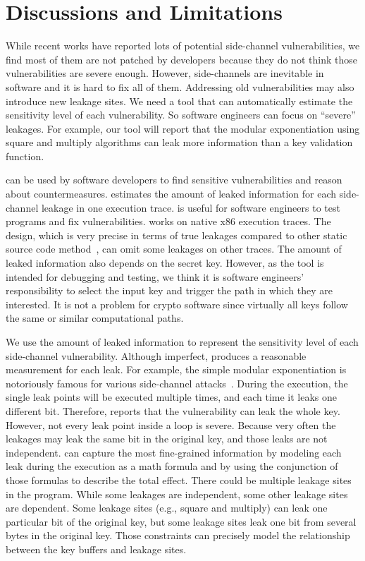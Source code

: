 \section{Discussions and Limitations}
While recent works have reported lots
of potential side-channel vulnerabilities, we find most of them are not patched by
developers because they do not think those vulnerabilities are severe enough.
However, side-channels are inevitable in software and it is hard to fix all of them. 
Addressing old vulnerabilities may also introduce new leakage
sites. We need a
tool that can automatically estimate the sensitivity level of each vulnerability.
So software engineers can focus on
``severe'' leakages. For example, our tool will report that 
the modular exponentiation using square and multiply algorithms can
leak more information than a key validation function.

\tool{} can be used by software developers to find sensitive vulnerabilities
and reason about countermeasures.
\tool{} estimates the amount of leaked information for each side-channel leakage
in one execution trace. \tool{} is useful for software
engineers to test programs and fix vulnerabilities.
\tool{} works on native x86 execution traces. The design, which is very
precise in terms of true leakages compared to other static source code
method~\cite{197207,BacelarAlmeida:2013:FVS:2483313.2483334}, can omit some
leakages on other traces. The amount of leaked information also depends on the secret key.
However, as the tool is intended for debugging and testing,
we think it is software engineers' responsibility to select the input key and trigger 
the path in which they are interested. It is not a problem for crypto software 
since virtually all keys follow the same or similar computational paths.

We use the amount of leaked information to represent the sensitivity level of 
each side-channel vulnerability. Although imperfect, \tool{} produces a reasonable 
measurement for each leak. For example, the simple modular exponentiation is 
notoriously famous for various side-channel attacks~\cite{kocher1996timing}. 
During the execution, the single leak points will be executed multiple times, 
and each time it leaks one different bit. Therefore, \tool{} reports that the 
vulnerability can leak the whole key. However, not every leak point inside a 
loop is severe. Because very often the leakages may leak the same bit in the 
original key, and those leaks are not independent. \tool{} can capture the most 
fine-grained information by modeling each leak during the execution as a math 
formula and by using the conjunction of those formulas to describe the total effect. 
There could be multiple leakage sites in the program. While some leakages are independent, 
some other leakage sites are dependent. Some leakage sites (e.g., square and multiply) 
can leak one particular bit of the original key, but some leakage sites leak one bit 
from several bytes in the original key. Those constraints can precisely model the 
relationship between the key buffers and leakage sites.

